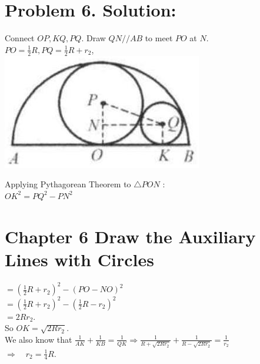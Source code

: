\documentclass[10pt]{article}
\begin{document}
\section*{Problem 6. Solution:}
Connect \(O P, K Q, P Q\). Draw \(Q N / / A B\) to meet \(P O\) at \(N\).\\
\(P O=\frac{1}{2} R, P Q=\frac{1}{2} R+r_{2}\),\\
\includegraphics[max width=\textwidth, center]{2025_04_17_97bc1f7e44d93c271a88g-188}

Applying Pythagorean Theorem to \(\triangle P O N\) :\\
\(O K^{2}=P Q^{2}-P N^{2}\)

\section*{Chapter 6 Draw the Auxiliary Lines with Circles}
\(=\left(\frac{1}{2} R+r_{2}\right)^{2}-(P O-N O)^{2}\)\\
\(=\left(\frac{1}{2} R+r_{2}\right)^{2}-\left(\frac{1}{2} R-r_{2}\right)^{2}\)\\
\(=2 R r_{2}\).\\
So \(O K=\sqrt{2 R r_{2}}\).\\
We also know that \(\frac{1}{A K}+\frac{1}{K B}=\frac{1}{Q K} \Rightarrow \frac{1}{R+\sqrt{2 R r_{2}}}+\frac{1}{R-\sqrt{2 R r_{2}}}=\frac{1}{r_{2}}\)\\
\(\Rightarrow \quad r_{2}=\frac{1}{4} R\).
\end{document}
